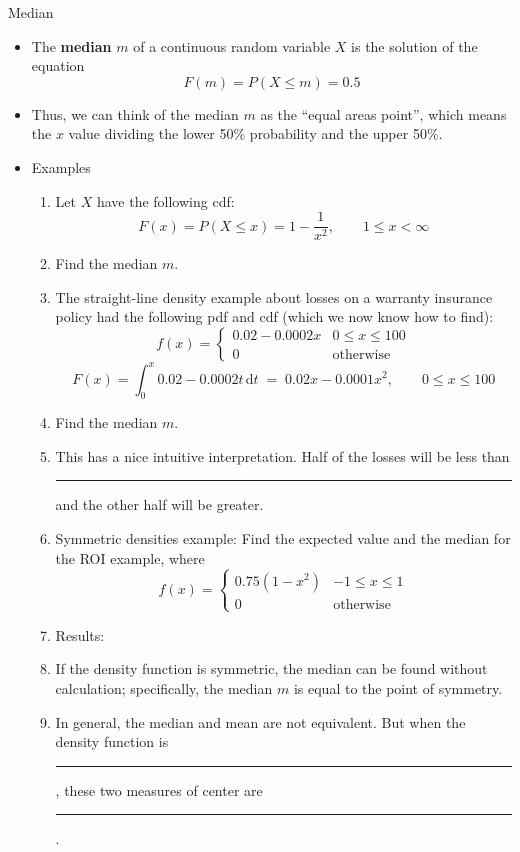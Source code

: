 \documentclass{article}
\newcommand{\blankul}[1]{\rule[-1.5mm]{#1}{0.15mm}}	%
\newcommand{\integral}[4]{\displaystyle \int_{#1}^{#2} #3 \,\mathrm{d} #4}		%
\begin{document}
Median\bigskip
\begin{itemize}
    \item The \textbf{median} $m$ of a continuous random variable $X$ is the solution of the equation
    \[F(m) = P(X \le m) = 0.5\]
    \item[] Thus, we can think of the median $m$ as the ``equal areas point'', which means the $x$ value dividing the lower 50\% probability and the upper 50\%.\bigskip
    \item Examples
    \begin{enumerate}
        \item Let $X$ have the following cdf:
        \[F(x) = P(X \le x) = 1 - \frac{1}{x^2}, \quad\quad 1 \le x < \infty\]
        \item[] Find the median $m$.\vspace{100pt}
        \item The straight-line density example about losses on a warranty insurance policy had the following pdf and cdf (which we now know how to find):
        \[
        f(x) =
            \left\{
            \begin{array}{ll}
                 0.02 - 0.0002x & 0 \le x \le 100\\
                 0 & \text{otherwise}
            \end{array}
            \right.
        \]
        \[F(x) = \integral{0}{x}{0.02 - 0.0002t}{t} \;=\; 0.02x - 0.0001x^2, \quad\quad 0 \le x \le 100\]
        \item[] Find the median $m$.\vspace{240pt}
        \item[] This has a nice intuitive interpretation. Half of the losses will be less than \blankul{2cm} and the other half will be greater.\bigskip

        \item Symmetric densities example: Find the expected value and the median for the ROI example, where
        \[
        f(x) =
            \left\{
            \begin{array}{ll}
                 0.75(1 - x^2) & -1 \le x \le 1\\
                 0 & \text{otherwise}
            \end{array}
            \right.
        \]\vspace{100pt}
        \item[] Results:
        \item[] If the density function is symmetric, the median can be found without calculation; specifically, the median $m$ is equal to the point of symmetry.
        \item[] In general, the median and mean are not equivalent. But when the density function is \blankul{3cm}, these two measures of center are \blankul{2cm}.\bigskip
    \end{enumerate}
\end{itemize}\bigskip
    
\end{document}

